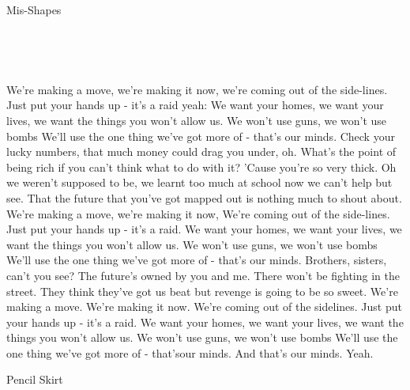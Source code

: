 \begin{song}{Mis-Shapes}{

	\mbox{ \AMaj \EMaj \Fshm \DMaj \DSeven}


	\mbox{ \GMaj \GMajSeven \GSeven \CMaj \CMajSeven \CSeven }
	
}
\begin{SongVerse}
		We're making a move, we're making it now, we're coming out of the side-lines. 
		Just put your hands up - it's a raid yeah: 
		We want your homes, we want your lives, 
		we want the things you won't allow us. 
		We won't use guns, we won't use bombs
		We'll use the one thing we've got more of - that's our minds. 
		Check your lucky numbers, that much money could drag you under, oh. 
		What's the point of being rich if you can't think what to do with it? 
		'Cause you're so very thick. 
		Oh we weren't supposed to be, we learnt too much at school now 
		we can't help but see. 
		That the future that you've got mapped out is nothing much to shout about. 
		We're making a move, we're making it now,
		We're coming out of the side-lines. 
		Just put your hands up - it's a raid. 
		We want your homes, we want your lives,
		we want the things you won't allow us. 
		We won't use guns, we won't use bombs
		We'll use the one thing we've got more of - that's our minds. 
		Brothers, sisters, can't you see? 
		The future's owned by you and me. 
		There won't be fighting in the street. 
		They think they've got us beat but revenge is going to be so sweet. 
		We're making a move. We're making it now. 
		We're coming out of the sidelines. 
		Just put your hands up - it's a raid. 
		We want your homes, we want your lives, 
		we want the things you won't allow us. 
		We won't use guns, we won't use bombs
		We'll use the one thing we've got more of - that'sour minds. 
		And that's our minds. Yeah. 
	 \end{SongVerse}

\end{song}

\begin{song}{Pencil Skirt}

\end{song}